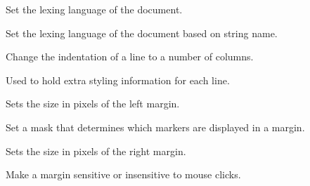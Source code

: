 \label{wxstyledtextctrlsetlexer}


Set the lexing language of the document.


\label{wxstyledtextctrlsetlexerlanguage}


Set the lexing language of the document based on string name.


\label{wxstyledtextctrlsetlineindentation}


Change the indentation of a line to a number of columns.


\label{wxstyledtextctrlsetlinestate}


Used to hold extra styling information for each line.


\label{wxstyledtextctrlsetmarginleft}


Sets the size in pixels of the left margin.


\label{wxstyledtextctrlsetmarginmask}


Set a mask that determines which markers are displayed in a margin.


\label{wxstyledtextctrlsetmarginright}


Sets the size in pixels of the right margin.


\label{wxstyledtextctrlsetmarginsensitive}


Make a margin sensitive or insensitive to mouse clicks.


